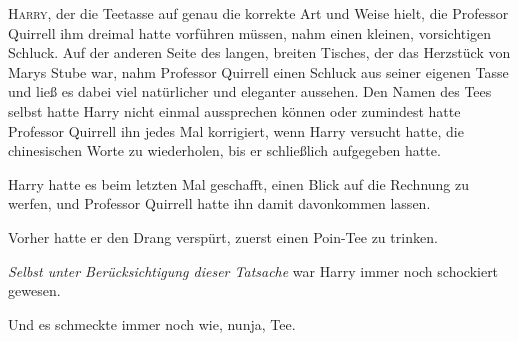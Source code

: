 
\lettrine{H}{arry}, der die Teetasse auf genau die korrekte Art und Weise hielt, die Professor Quirrell ihm dreimal hatte vorführen müssen, nahm einen kleinen, vorsichtigen Schluck. Auf der anderen Seite des langen, breiten Tisches, der das Herzstück von Marys Stube war, nahm Professor Quirrell einen Schluck aus seiner eigenen Tasse und ließ es dabei viel natürlicher und eleganter aussehen. Den Namen des Tees selbst hatte Harry nicht einmal aussprechen können oder zumindest hatte Professor Quirrell ihn jedes Mal korrigiert, wenn Harry versucht hatte, die chinesischen Worte zu wiederholen, bis er schließlich aufgegeben hatte.

Harry hatte es beim letzten Mal geschafft, einen Blick auf die Rechnung zu werfen, und Professor Quirrell hatte ihn damit davonkommen lassen.

Vorher hatte er den Drang verspürt, zuerst einen Poin-Tee zu trinken.

\emph{Selbst unter Berücksichtigung dieser Tatsache} war Harry immer noch schockiert gewesen.

Und es schmeckte immer noch wie, nunja, Tee.

